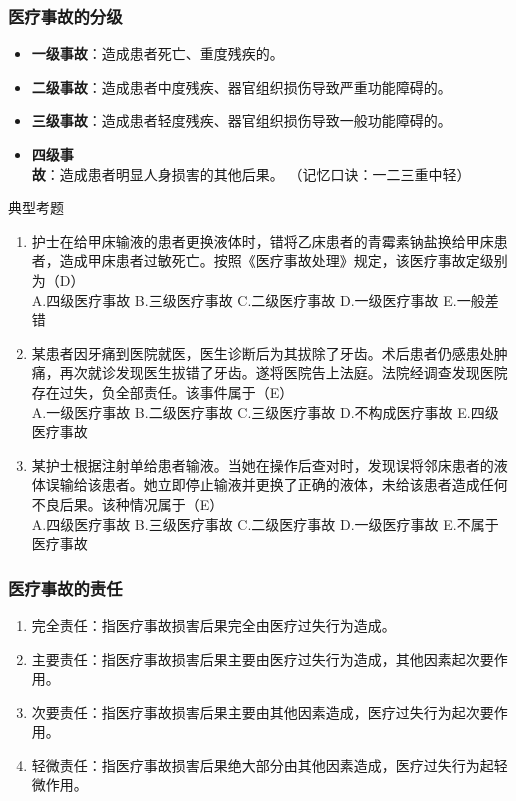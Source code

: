 \documentclass[11pt, a4paper]{ctexart}
\begin{document}
\subsubsection{医疗事故的分级}
\begin{itemize}
    \item \textbf{一级事故}：造成患者死亡、重度残疾的。
    \item \textbf{二级事故}：造成患者中度残疾、器官组织损伤导致严重功能障碍的。
    \item \textbf{三级事故}：造成患者轻度残疾、器官组织损伤导致一般功能障碍的。
    \item \textbf{四级事故}：造成患者明显人身损害的其他后果。
    （记忆口诀：一二三重中轻）
\end{itemize}

\begin{examplebox}{典型考题}
\begin{enumerate}
    \item 护士在给甲床输液的患者更换液体时，错将乙床患者的青霉素钠盐换给甲床患者，造成甲床患者过敏死亡。按照《医疗事故处理》规定，该医疗事故定级别为（D）\\
    A.四级医疗事故 \quad B.三级医疗事故 \quad C.二级医疗事故 \quad D.一级医疗事故 \quad E.一般差错
    \item 某患者因牙痛到医院就医，医生诊断后为其拔除了牙齿。术后患者仍感患处肿痛，再次就诊发现医生拔错了牙齿。遂将医院告上法庭。法院经调查发现医院存在过失，负全部责任。该事件属于（E）\\
    A.一级医疗事故 \quad B.二级医疗事故 \quad C.三级医疗事故 \quad D.不构成医疗事故 \quad E.四级医疗事故
    \item 某护士根据注射单给患者输液。当她在操作后查对时，发现误将邻床患者的液体误输给该患者。她立即停止输液并更换了正确的液体，未给该患者造成任何不良后果。该种情况属于（E）\\
    A.四级医疗事故 \quad B.三级医疗事故 \quad C.二级医疗事故 \quad D.一级医疗事故 \quad E.不属于医疗事故
\end{enumerate}
\end{examplebox}

\subsubsection{医疗事故的责任}
\begin{enumerate}
    \item 完全责任：指医疗事故损害后果完全由医疗过失行为造成。
    \item 主要责任：指医疗事故损害后果主要由医疗过失行为造成，其他因素起次要作用。
    \item 次要责任：指医疗事故损害后果主要由其他因素造成，医疗过失行为起次要作用。
    \item 轻微责任：指医疗事故损害后果绝大部分由其他因素造成，医疗过失行为起轻微作用。
\end{enumerate}
\end{document}
